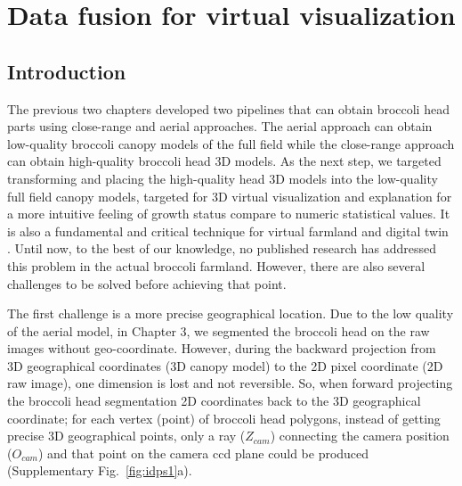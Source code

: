 \chapter{Data fusion for virtual visualization}

\section{Introduction}

The previous two chapters developed two pipelines that can obtain broccoli head parts using close-range and aerial approaches. The aerial approach can obtain low-quality broccoli canopy models of the full field while the close-range approach can obtain high-quality broccoli head 3D models. As the next step, we targeted transforming and placing the high-quality head 3D models into the low-quality full field canopy models, targeted for 3D virtual visualization and explanation for a more intuitive feeling of growth status compare to numeric statistical values. It is also a fundamental and critical technique for virtual farmland and digital twin \citep{pylianidis_introducing_2021, slob_virtual_2023}. Until now, to the best of our knowledge, no published research has addressed this problem in the actual broccoli farmland. However, there are also several challenges to be solved before achieving that point. 

The first challenge is a more precise geographical location. Due to the low quality of the aerial model, in Chapter 3, we segmented the broccoli head on the raw images without geo-coordinate. However, during the backward projection from 3D geographical coordinates (3D canopy model) to the 2D pixel coordinate (2D raw image), one dimension is lost and not reversible. So, when forward projecting the broccoli head segmentation 2D coordinates back to the 3D geographical coordinate; for each vertex (point) of broccoli head polygons, instead of getting precise 3D geographical points, only a ray ($Z_{cam}$) connecting the camera position ($O_{cam}$) and that point on the camera \gls{ccd} plane could be produced (Supplementary Fig.~\ref{fig:idps1}a). 

